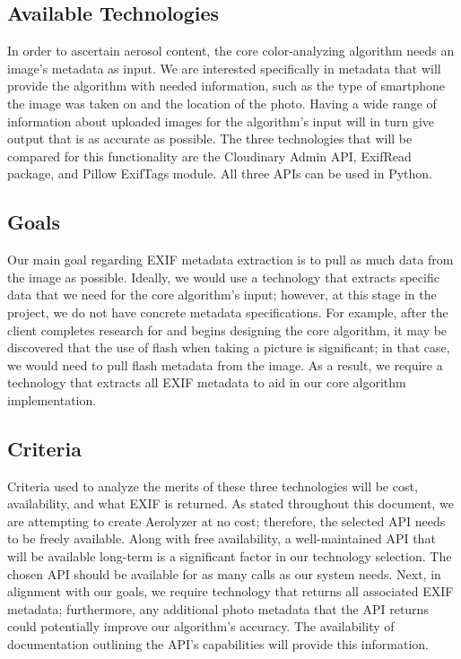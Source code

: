 \documentclass[onecolumn, draftclsnofoot,10pt, compsoc]{IEEEtran}
\begin{document}
\begin{flushleft}
\subsection{Available Technologies}
In order to ascertain aerosol content, the core color-analyzing algorithm needs an image's metadata as input. We are interested specifically in metadata that will provide the algorithm with needed information, such as the type of smartphone the image was taken on and the location of the photo. Having a wide range of information about uploaded images for the algorithm's input will in turn give output that is as accurate as possible. The three technologies that will be compared for this functionality are the Cloudinary Admin API, ExifRead package, and Pillow ExifTags module. All three APIs can be used in Python. \cite{22} \cite{23} \cite{24}

\subsection{Goals}
Our main goal regarding EXIF metadata extraction is to pull as much data from the image as possible. Ideally, we would use a technology that extracts specific data that we need for the core algorithm's input; however, at this stage in the project, we do not have concrete metadata specifications. For example, after the client completes research for and begins designing the core algorithm, it may be discovered that the use of flash when taking a picture is significant; in that case, we would need to pull flash metadata from the image. As a result, we require a technology that extracts all EXIF metadata to aid in our core algorithm implementation.

\subsection{Criteria}
Criteria used to analyze the merits of these three technologies will be cost, availability, and what EXIF is returned. As stated throughout this document, we are attempting to create Aerolyzer at no cost; therefore, the selected API needs to be freely available. Along with free availability, a well-maintained API that will be available long-term is a significant factor in our technology selection. The chosen API should be available for as many calls as our system needs. Next, in alignment with our goals, we require technology that returns all associated EXIF metadata; furthermore, any additional photo metadata that the API returns could potentially improve our algorithm's accuracy. The availability of documentation outlining the API's capabilities will provide this information. 


\end{flushleft}
\end{document}
